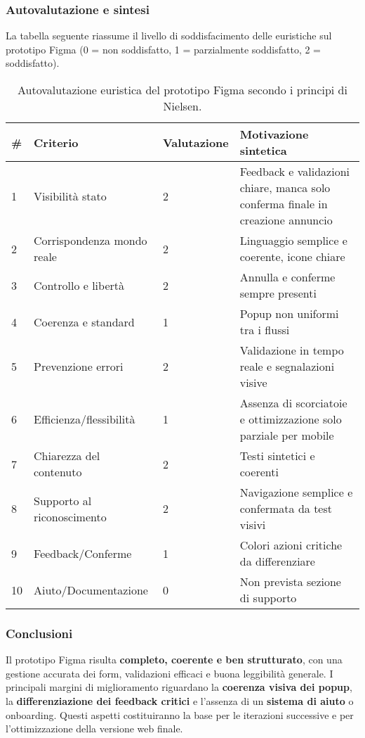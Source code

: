 \subsubsection*{Autovalutazione e sintesi}  
La tabella seguente riassume il livello di soddisfacimento delle euristiche sul prototipo Figma (0 = non soddisfatto, 1 = parzialmente soddisfatto, 2 = soddisfatto).

\begin{table}[h!]
\centering
\begin{tabular}{p{0.4cm} p{4cm} p{1.5cm} p{7cm}}
\hline
\textbf{\#} & \textbf{Criterio} & \textbf{Valutazione} & \textbf{Motivazione sintetica} \\ \hline
1 & Visibilità stato & 2 & Feedback e validazioni chiare, manca solo conferma finale in creazione annuncio \\
2 & Corrispondenza mondo reale & 2 & Linguaggio semplice e coerente, icone chiare \\
3 & Controllo e libertà & 2 & Annulla e conferme sempre presenti \\
4 & Coerenza e standard & 1 & Popup non uniformi tra i flussi \\
5 & Prevenzione errori & 2 & Validazione in tempo reale e segnalazioni visive \\
6 & Efficienza/flessibilità & 1 & Assenza di scorciatoie e ottimizzazione solo parziale per mobile \\
7 & Chiarezza del contenuto & 2 & Testi sintetici e coerenti \\
8 & Supporto al riconoscimento & 2 & Navigazione semplice e confermata da test visivi \\
9 & Feedback/Conferme & 1 & Colori azioni critiche da differenziare \\
10 & Aiuto/Documentazione & 0 & Non prevista sezione di supporto \\ \hline
\end{tabular}
\caption{Autovalutazione euristica del prototipo Figma secondo i principi di Nielsen.}
\end{table}

\subsubsection*{Conclusioni}  
Il prototipo Figma risulta \textbf{completo, coerente e ben strutturato}, con una gestione accurata dei form, validazioni efficaci e buona leggibilità generale.  
I principali margini di miglioramento riguardano la \textbf{coerenza visiva dei popup}, la \textbf{differenziazione dei feedback critici} e l’assenza di un \textbf{sistema di aiuto} o onboarding.  
Questi aspetti costituiranno la base per le iterazioni successive e per l’ottimizzazione della versione web finale.
